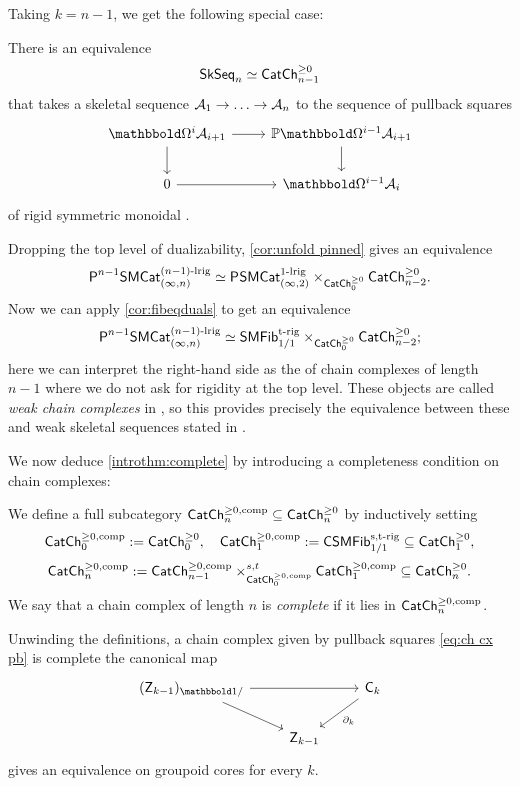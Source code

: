 \documentclass[a4paper,11pt]{article}
\begin{document}
Taking $k = n-1$, we get the following special case:
\begin{cornoproof}\label{cor:skseq cch eq}
  There is an equivalence
  \[ \SkSeq_{n} \simeq 
    \CChp_{n-1}\]
  that takes a skeletal sequence $\nA_{1} \to \dots \to \nA_{n}$ to
  the sequence of pullback squares
\[
  \begin{tikzcd}
   \mOm^{i}\nA_{i+1} \ar[r] \ar[d] & \mP\mOm^{i-1}\nA_{i+1}  \ar[d] \\
   0 \ar[r] & \mOm^{i-1}\nA_{i}
  \end{tikzcd}
\]
of rigid symmetric monoidal \icats{}.
\end{cornoproof}

\begin{observation}\label{obs:weak chain cx}
  Dropping the top level of dualizability, \cref{cor:unfold pinned}
  gives an equivalence
  \[ \PSMCat[n-1]_{(\infty,n)}^{(n-1)\dlrig} \simeq
    \PSMCat_{(\infty,2)}^{1\dlrig} \times_{\CChp_{0}}
    \CChp_{n-2}.\]
  Now we can apply \cref{cor:fibeqduals} to get an equivalence
  \[ \PSMCat[n-1]_{(\infty,n)}^{(n-1)\dlrig} \simeq
    \SMFibtrig_{1/1} \times_{\CChp_{0}}
    \CChp_{n-2};\]
  here we can interpret the right-hand side as the \icat{} of chain
  complexes of length $n-1$ where we do not ask for rigidity at the
  top level. These objects are called \emph{weak chain complexes} in
  \cite{LurieCob}, so this provides precisely the equivalence between these and
  weak skeletal sequences stated in \cite[Proposition 3.3.33]{LurieCob}.  
\end{observation}

We now deduce \cref{introthm:complete} by introducing a completeness
condition on chain complexes:
\begin{defn}
  We define a full subcategory $\CChpc_{n} \subseteq \CChp_{n}$ by
  inductively setting
  \[ \CChpc_{0} := \CChp_{0}, \quad \CChpc_{1} := \CSMFib_{1/1}^{\strig}
    \subseteq \CChp_{1},\]
  \[ \CChpc_{n} := \CChpc_{n-1} \times_{\CChpc_{0}}^{s,t} \CChpc_{1}
    \subseteq \CChp_{n}.\]
  We say that a chain complex of length $n$
  is \emph{complete} if it lies in $\CChpc_{n}$.
\end{defn}

\begin{observation}
  Unwinding the definitions, a chain complex given by pullback squares
  \cref{eq:ch cx pb} is complete \IFF{} the canonical map
  \[
    \begin{tikzcd}
     (\oZ_{k-1})_{\bbone/} \ar[rr] \ar[dr] & & \oC_{k} \ar[dl, "\partial_{k}"] \\
      & \oZ_{k-1}
    \end{tikzcd}
  \]
  gives an equivalence on groupoid cores for every $k$.
\end{observation}
\end{document}
